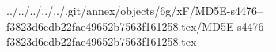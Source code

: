 ../../../../../.git/annex/objects/6g/xF/MD5E-s4476--f3823d6edb22fae49652b7563f161258.tex/MD5E-s4476--f3823d6edb22fae49652b7563f161258.tex